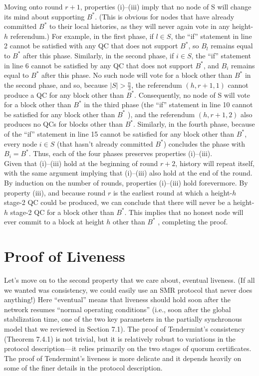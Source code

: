Moving onto round $r+1$, properties (i)–(iii) imply that no node of S will change its mind
about supporting $B^*$. (This is obvious for nodes that have already committed $B^*$
to their local histories, as they will never again vote in any height-$h$ referendum.) For example, in
the first phase, if $l \in S$, the “if” statement in line 2 cannot be satisfied with any QC that
does not support $B^*$, so $B_l$ remains equal to $B^*$ after this phase. Similarly, in the second
phase, if $i \in S$, the “if” statement in line 6 cannot be satisfied by any QC that does not
support $B^*$, and $B_i$ remains equal to $B^*$ after this phase. No such node will vote for a block
other than $B^*$ in the second phase, and so, because $|S| > \frac{n}{3}$, the referendum $(h, r + 1, 1)$
cannot produce a QC for any block other than $B^*$. Consequently, no node of S will vote for a block other than $B^*$
in the third phase (the “if” statement in line 10 cannot be satisfied
for any block other than $B^*$
), and the referendum $(h, r + 1, 2)$ also produces no QCs for
blocks other than $B^*$. Similarly, in the fourth phase, because of the “if” statement in line 15
cannot be satisfied for any block other than $B^*$, every node $i \in S$ (that hasn't already
committed $B^*$) concludes the phase with $B_i = B^*$. Thus, each of the four phases preserves
properties (i)–(iii).\\
Given that (i)–(iii) hold at the beginning of round $r+2$, history will repeat itself, with the
same argument implying that (i)–(iii) also hold at the end of the round. By induction
on the number of rounds, properties (i)–(iii) hold forevermore. By property (iii), and because
round $r$ is the earliest round at which a height-$h$ stage-2 QC could be produced,
we can conclude that there will never be a height-$h$ stage-2 QC for a block other than $B^*$.
This implies that no honest node will ever commit to a block at height $h$ other than $B^*$
, completing the proof.

\section{Proof of Liveness}
Let’s move on to the second property that we care about, eventual liveness. (If all
we wanted was consistency, we could easily use an SMR protocol that never does
anything!) Here “eventual” means that liveness should hold soon after the network resumes
“normal operating conditions” (i.e., soon after the global stabilization time, one of the two
key parameters in the partially synchronous model that we reviewed in Section 7.1).
The proof of Tendermint’s consistency (Theorem 7.4.1) is not trivial, but it is relatively
robust to variations in the protocol description—it relies primarily on the two stages of
quorum certificates. The proof of Tendermint’s liveness is more delicate and it depends
heavily on some of the finer details in the protocol description.


